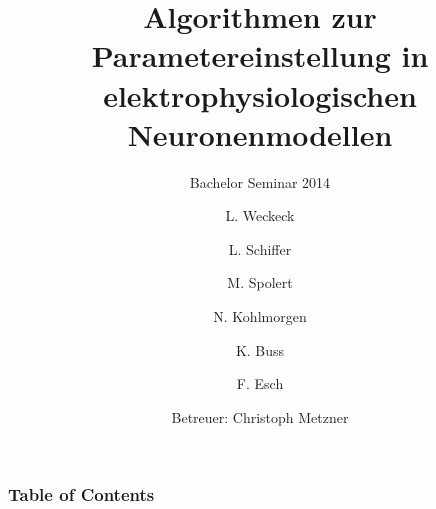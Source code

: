 \documentclass[12pt]{beamer}
\title{Algorithmen zur Parametereinstellung in elektrophysiologischen Neuronenmodellen}
\subtitle{Bachelor Seminar 2014}
\author{L. Weckeck \and L. Schiffer \and M. Spolert \and N. Kohlmorgen \and K. Buss \and F. Esch}
\institute{
  Institut für Robotik und Kognitive Systeme\\
  Universität zu Lübeck
}
\date{Betreuer: Christoph Metzner}
\begin{document}
\begin{frame}
  \titlepage
\end{frame}

\begin{frame}
  \frametitle{Table of Contents}
  \tableofcontents
\end{frame}



\end{document}
